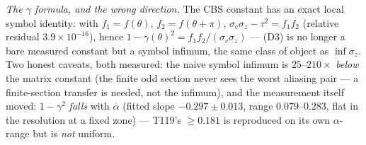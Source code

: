 \documentclass[11pt,a4paper]{article}
\begin{document}
\emph{The $\gamma$ formula, and the wrong direction.} The CBS constant has an exact local
symbol identity: with $f_1=f(\theta)$, $f_2=f(\theta+\pi)$,
$\sigma_c\sigma_z-\tau^2=f_1f_2$ (relative residual $3.9\times10^{-16}$), hence
$1-\gamma(\theta)^2=f_1f_2/(\sigma_c\sigma_z)$ --- (D3) is no longer a bare measured constant
but a symbol infimum, the same class of object as $\inf\sigma_z$. Two honest caveats, both
measured: the naive symbol infimum is $25$--$210\times$ \emph{below} the matrix constant (the
finite odd section never sees the worst aliasing pair --- a finite-section transfer is
needed, not the infimum), and the measurement itself moved: $1-\gamma^2$ \emph{falls} with
$\alpha$ (fitted slope $-0.297\pm0.013$, range $0.079$--$0.283$, flat in the resolution at a
fixed zone) --- T119's $\ge0.181$ is reproduced on its own $\alpha$-range but is \emph{not}
uniform.
\end{document}
